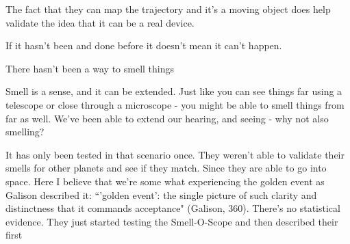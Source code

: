 \documentclass[11pt, oneside]{article}
\begin{document}
\par The fact that they can map the trajectory and it's a moving object does help validate the idea that it can be a real device. 


\par If it hasn't been and done before it doesn't mean it can't happen.

\par There hasn't been a way to smell things 

\par Smell is a sense, and it can be extended. Just like you can see things far using a telescope or close through a microscope - you might be able to smell things from far as well. We've been able to extend our hearing, and seeing - why not also smelling?

\par It has only been tested in that scenario once. They weren't able to validate their smells for other planets and see if they match. Since they are able to go into space. Here I believe that we're some what experiencing the golden event as Galison described it: ``'golden event': the single picture of such clarity and distinctness that it commands acceptance" (Galison, 360). There's no statistical evidence. They just started testing the Smell-O-Scope and then described their first 
\end{document}
